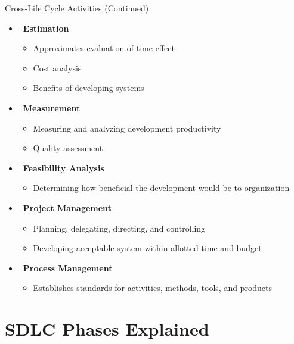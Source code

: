 \documentclass[aspectratio=169]{beamer}
\begin{document}
\begin{frame}{Cross-Life Cycle Activities (Continued)}
    \begin{itemize}
        \item\, \textbf{Estimation}
        \begin{itemize}
            \item Approximates evaluation of time effect
            \item Cost analysis
            \item Benefits of developing systems
        \end{itemize}
        
        \item\, \textbf{Measurement}
        \begin{itemize}
            \item Measuring and analyzing development productivity
            \item Quality assessment
        \end{itemize}
        
        \item\, \textbf{Feasibility Analysis}
        \begin{itemize}
            \item Determining how beneficial the development would be to organization
        \end{itemize}
        
        \item\, \textbf{Project Management}
        \begin{itemize}
            \item Planning, delegating, directing, and controlling
            \item Developing acceptable system within allotted time and budget
        \end{itemize}
        
        \item \faCogs\, \textbf{Process Management}
        \begin{itemize}
            \item Establishes standards for activities, methods, tools, and products
        \end{itemize}
    \end{itemize}
\end{frame}

\section{SDLC Phases Explained}
\end{document}
